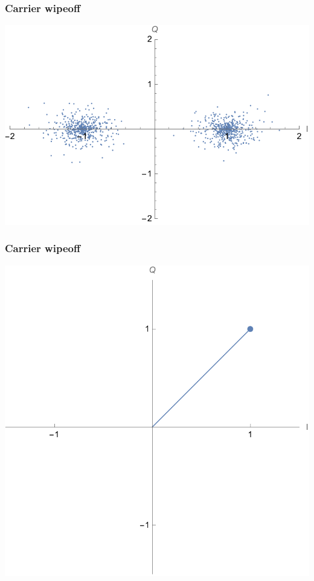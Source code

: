 \documentclass[aspectratio=169]{beamer}
\begin{document}
\begin{frame}
    \frametitle{Carrier wipeoff}

    \centering
    \includegraphics[width=\textwidth * 3 / 5]{3 correlations.pdf}
\end{frame}

\begin{frame}
    \frametitle{Carrier wipeoff}

    \centering
    \includegraphics[width=\textwidth / 3]{4 bit ambiguity.pdf}
\end{frame}
\end{document}
